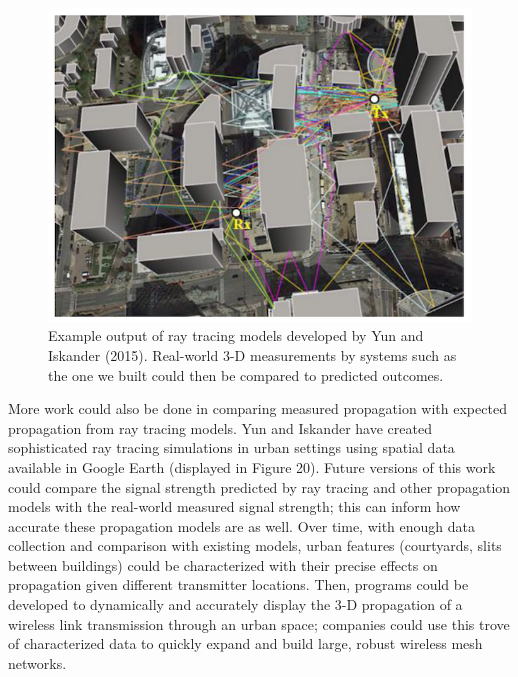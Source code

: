 \documentclass[pageno]{jpaper}
\begin{document}
\begin{figure}[]
\caption{Example output of ray tracing models developed by Yun and Iskander (2015). Real-world 3-D measurements by systems such as the one we built could then be compared to predicted outcomes.}
\centerline{\includegraphics{ray_tracing}}
\end{figure}

More work could also be done in comparing measured propagation with expected propagation from ray tracing models. Yun and Iskander have created sophisticated ray tracing simulations in urban settings using spatial data available in Google Earth (displayed in Figure 20). Future versions of this work could compare the signal strength predicted by ray tracing and other propagation models with the real-world measured signal strength; this can inform how accurate these propagation models are as well. Over time, with enough data collection and comparison with existing models, urban features (courtyards, slits between buildings) could be characterized with their precise effects on propagation given different transmitter locations. Then, programs could be developed to dynamically and accurately display the 3-D propagation of a wireless link transmission through an urban space; companies could use this trove of characterized data to quickly expand and build large, robust wireless mesh networks.




 
\end{document}
